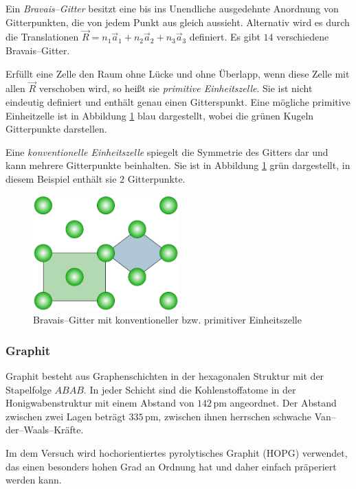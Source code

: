 \documentclass[12pt,a4paper]{scrartcl}
\numberwithin{equation}{section} %
\begin{document}
Ein \textit{Bravais--Gitter} besitzt eine bis ins Unendliche ausgedehnte Anordnung von Gitterpunkten, die von jedem Punkt aus gleich aussieht. Alternativ wird es durch die Translationen $\vec{R} = n_1\vec{a}_1 + n_2\vec{a}_2 + n_3\vec{a}_3$ definiert. Es gibt $14$ verschiedene Bravais--Gitter.

Erfüllt eine Zelle den Raum ohne Lücke und ohne Überlapp, wenn diese Zelle mit allen $\vec{R}$ verschoben wird, so heißt sie \textit{primitive Einheitszelle}. Sie ist nicht eindeutig definiert und enthält genau einen Gitterspunkt. Eine mögliche primitive Einheitzelle ist in Abbildung \ref{abb:bravais} blau dargestellt, wobei die grünen Kugeln Gitterpunkte darstellen.

Eine \textit{konventionelle Einheitszelle} spiegelt die Symmetrie des Gitters dar und kann mehrere Gitterpunkte beinhalten. Sie ist in Abbildung \ref{abb:bravais} grün dargestellt, in diesem Beispiel enthält sie $2$ Gitterpunkte.

\begin{figure}[ht]
	\centering
	\includegraphics[width=0.5\textwidth]{../media/B2.5/975px-Rectangular_unit_cells_centered.svg.png}
	\caption{Bravais--Gitter mit konventioneller bzw. primitiver Einheitszelle \cite{WikipediaBravaisgitter}}
	\label{abb:bravais}
\end{figure}

\hypertarget{graphitstruktur}{%
\subsubsection{Graphit}\label{graphitstruktur}}
Graphit besteht aus Graphenschichten in der hexagonalen Struktur mit der Stapelfolge $ABAB$. In jeder Schicht sind die Kohlenstoffatome in der Honigwabenstruktur mit einem Abstand von $142\mathrm{\,pm}$ angeordnet. Der Abstand zwischen zwei Lagen beträgt $335\mathrm{\,pm}$, zwischen ihnen herrschen schwache Van--der--Waals--Kräfte.

Im dem Versuch wird hochorientiertes pyrolytisches Graphit (HOPG) verwendet, das einen besonders hohen Grad an Ordnung hat und daher einfach präperiert werden kann.
\end{document}
